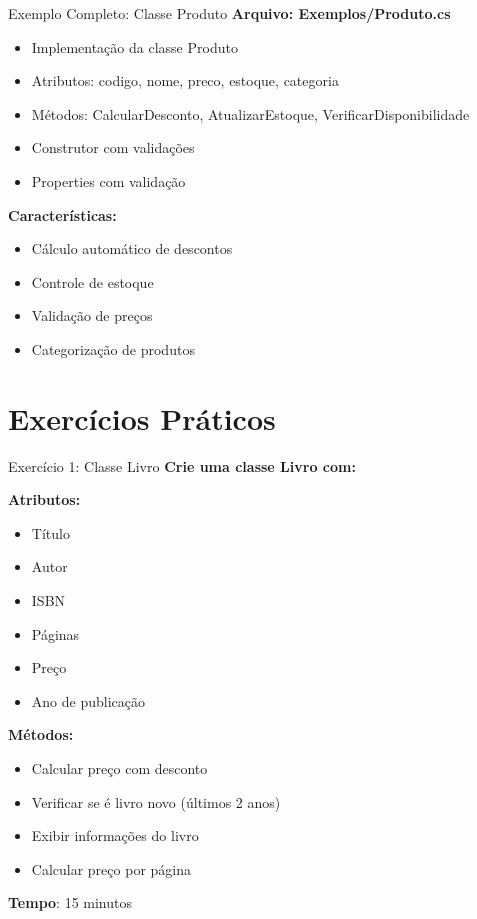 \documentclass[aspectratio=169]{beamer}
\begin{document}
\begin{frame}{Exemplo Completo: Classe Produto}
\textbf{Arquivo: Exemplos/Produto.cs}
\begin{itemize}
\item Implementação da classe Produto
\item Atributos: codigo, nome, preco, estoque, categoria
\item Métodos: CalcularDesconto, AtualizarEstoque, VerificarDisponibilidade
\item Construtor com validações
\item Properties com validação
\end{itemize}

\vspace{0.3cm}
\textbf{Características:}
\begin{itemize}
\item Cálculo automático de descontos
\item Controle de estoque
\item Validação de preços
\item Categorização de produtos
\end{itemize}
\end{frame}

\section{Exercícios Práticos}

\begin{frame}{Exercício 1: Classe Livro}
\textbf{Crie uma classe Livro com:}

\textbf{Atributos:}
\begin{itemize}
\item Título
\item Autor
\item ISBN
\item Páginas
\item Preço
\item Ano de publicação
\end{itemize}

\textbf{Métodos:}
\begin{itemize}
\item Calcular preço com desconto
\item Verificar se é livro novo (últimos 2 anos)
\item Exibir informações do livro
\item Calcular preço por página
\end{itemize}

\vspace{0.3cm}
\textbf{Tempo}: 15 minutos
\end{frame}
\end{document}
